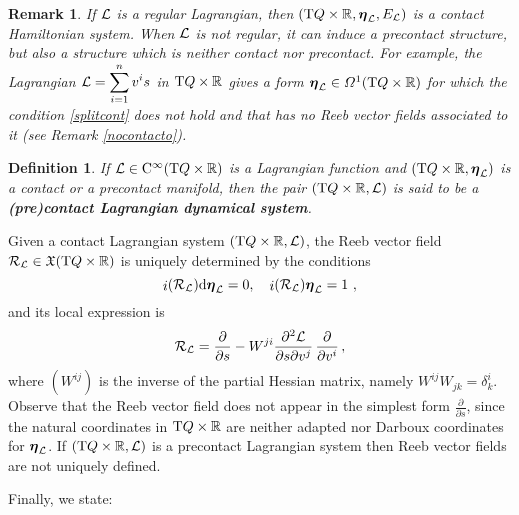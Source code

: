 \documentclass[12pt]{report}
\newtheorem{definition}[teor]{Definition}
\newtheorem{remark}[teor]{Remark}
\def\dst{\displaystyle}
\def\derpar#1#2{\frac{\partial{#1}}{\partial{#2}}}
\def\vf{\mathfrak X}
\def\df{{\mit\Omega}}
\def\Lag{{\cal L}}
\def\d{{\rm d}}
\def\Real{\mathbb{R}}
\def\bmeta{\mbox{\boldmath $\eta$}}
\def\Tan{{\rm T}}
\def\inn{\mathop{i}\nolimits}
\def\Cinfty{{\rm C}^\infty}
\newcommand{\Reeb}{\mathcal{R}}
\begin{document}
\begin{remark}
\label{nocontact}{\rm
If $\Lag$ is a regular Lagrangian, then
$(\Tan Q\times\Real,\bmeta_\Lag,E_\Lag)$
is a contact Hamiltonian system.
When $\Lag$ is not regular, it can induce a precontact structure, but also a structure which is neither contact nor precontact.
For example, 
the Lagrangian $\displaystyle \Lag=\sum_{i=1}^n v^i s$ in $\Tan Q\times\Real$
gives a form $\bmeta_\Lag\in\df^1(\Tan Q\times\Real)$
for which the condition \eqref{splitcont} does not hold
and that has no Reeb vector fields associated to it
(see Remark \ref{nocontacto}).
}\end{remark}

\begin{definition}
If $\Lag \in \Cinfty (\Tan Q\times\Real)$ is a Lagrangian function and $(\Tan Q\times\Real,\bmeta_\Lag)$ is
a contact or a precontact manifold, then
the pair $(\Tan Q\times\Real,\Lag)$ is said to be a {\sl\textbf{(pre)contact Lagrangian dynamical system}}.
\label{stdlr1}
\end{definition}

Given a contact Lagrangian system $(\Tan Q\times\Real,\Lag)$, the Reeb vector field $\Reeb_\Lag\in\vf(\Tan Q\times\Real)$ is uniquely determined by the conditions
\begin{equation}\label{eq:reeb}
    \inn(\Reeb_\Lag)\d\bmeta_\Lag=0 ,\quad \inn(\Reeb_\Lag)\bmeta_\Lag=1 \ ,
\end{equation}
and its local expression is
\begin{equation}
\label{coorReeb}
\Reeb_\Lag=\frac{\partial}{\partial s}-W^{ji}\frac{\partial^2\Lag}{\partial s \partial v^j}\,\frac{\partial}{\partial v^i} \,,
\end{equation}
where $(W^{ij})$ is the inverse of the partial Hessian matrix,
namely 
$W^{ij} W_{jk} = \delta^i_{k}$.
Observe that the Reeb vector field does not appear
in the simplest form $\dst\derpar{}{s}$,
since the natural coordinates in $\Tan Q \times \Real$
are neither adapted nor Darboux coordinates for $\bmeta_\Lag$.
If $(\Tan Q\times\Real,\Lag)$ is a precontact Lagrangian system then Reeb vector fields are not uniquely defined.

Finally, we state:
\end{document}
